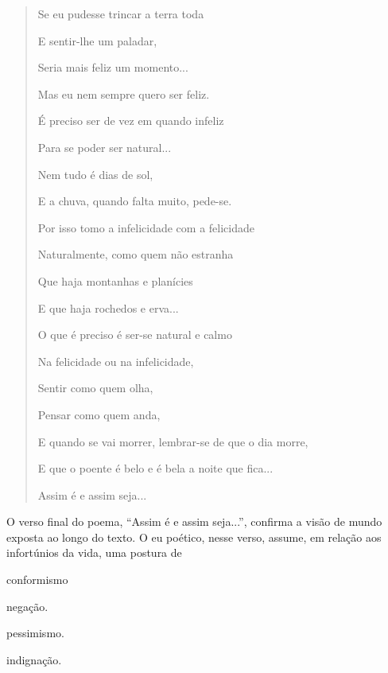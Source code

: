 \begin{quote}
Se eu pudesse trincar a terra toda

E sentir-lhe um paladar,

Seria mais feliz um momento...

Mas eu nem sempre quero ser feliz.

É preciso ser de vez em quando infeliz

Para se poder ser natural...

Nem tudo é dias de sol,

E a chuva, quando falta muito, pede-se.

Por isso tomo a infelicidade com a felicidade

Naturalmente, como quem não estranha

Que haja montanhas e planícies

E que haja rochedos e erva...

O que é preciso é ser-se natural e calmo

Na felicidade ou na infelicidade,

Sentir como quem olha,

Pensar como quem anda,

E quando se vai morrer, lembrar-se de que o dia morre,

E que o poente é belo e é bela a noite que fica...

Assim é e assim seja...
\end{quote}


O verso final do poema, ``Assim é e assim seja...'', confirma a visão de
mundo exposta ao longo do texto. O eu poético, nesse verso, assume, em
relação aos infortúnios da vida, uma postura de

\begin{escolha}
\item conformismo

\item negação.

\item pessimismo.

\item indignação.
\end{escolha}